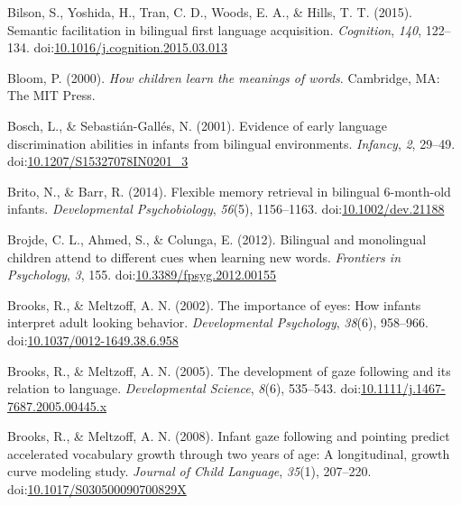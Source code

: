 \documentclass[,man,floatsintext]{apa6}
\begin{document}
\leavevmode\hypertarget{ref-Bilson_etal_2015}{}%
Bilson, S., Yoshida, H., Tran, C. D., Woods, E. A., \& Hills, T. T. (2015). Semantic facilitation in bilingual first language acquisition. \emph{Cognition}, \emph{140}, 122--134. doi:\href{https://doi.org/10.1016/j.cognition.2015.03.013}{10.1016/j.cognition.2015.03.013}

\leavevmode\hypertarget{ref-Bloom_2000}{}%
Bloom, P. (2000). \emph{How children learn the meanings of words}. Cambridge, MA: The MIT Press.

\leavevmode\hypertarget{ref-Bosch_Sebastian-Galles_2001}{}%
Bosch, L., \& Sebastián-Gallés, N. (2001). Evidence of early language discrimination abilities in infants from bilingual environments. \emph{Infancy}, \emph{2}, 29--49. doi:\href{https://doi.org/10.1207/S15327078IN0201_3}{10.1207/S15327078IN0201\_3}

\leavevmode\hypertarget{ref-Brito_Barr_2014}{}%
Brito, N., \& Barr, R. (2014). Flexible memory retrieval in bilingual 6-month-old infants. \emph{Developmental Psychobiology}, \emph{56}(5), 1156--1163. doi:\href{https://doi.org/10.1002/dev.21188}{10.1002/dev.21188}

\leavevmode\hypertarget{ref-Brojde_etal_2012}{}%
Brojde, C. L., Ahmed, S., \& Colunga, E. (2012). Bilingual and monolingual children attend to different cues when learning new words. \emph{Frontiers in Psychology}, \emph{3}, 155. doi:\href{https://doi.org/10.3389/fpsyg.2012.00155}{10.3389/fpsyg.2012.00155}

\leavevmode\hypertarget{ref-Brooks_Meltzoff_2002}{}%
Brooks, R., \& Meltzoff, A. N. (2002). The importance of eyes: How infants interpret adult looking behavior. \emph{Developmental Psychology}, \emph{38}(6), 958--966. doi:\href{https://doi.org/10.1037/0012-1649.38.6.958}{10.1037/0012-1649.38.6.958}

\leavevmode\hypertarget{ref-Brooks_Meltzoff_2005}{}%
Brooks, R., \& Meltzoff, A. N. (2005). The development of gaze following and its relation to language. \emph{Developmental Science}, \emph{8}(6), 535--543. doi:\href{https://doi.org/10.1111/j.1467-7687.2005.00445.x}{10.1111/j.1467-7687.2005.00445.x}

\leavevmode\hypertarget{ref-Brooks_Meltzoff_2008}{}%
Brooks, R., \& Meltzoff, A. N. (2008). Infant gaze following and pointing predict accelerated vocabulary growth through two years of age: A longitudinal, growth curve modeling study. \emph{Journal of Child Language}, \emph{35}(1), 207--220. doi:\href{https://doi.org/10.1017/S030500090700829X}{10.1017/S030500090700829X}
\end{document}
